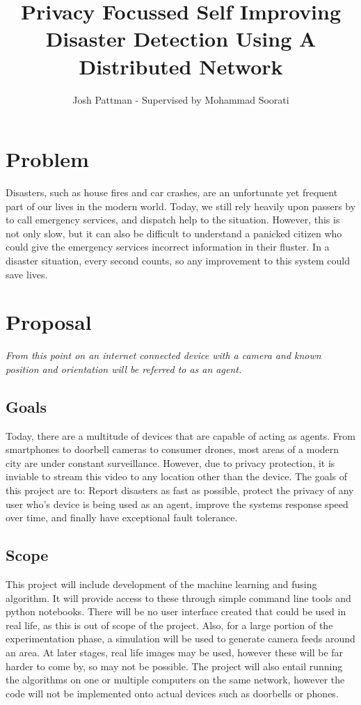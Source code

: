 \documentclass{article}
\title{Privacy Focussed Self Improving Disaster Detection Using A Distributed Network}
\author{Josh Pattman - Supervised by Mohammad Soorati}
\begin{document}
\maketitle

\section{Problem}
Disasters, such as house fires and car crashes, are an unfortunate yet frequent part of our lives in the modern world. Today, we still rely heavily upon passers by to call emergency services, and dispatch help to the situation. However, this is not only slow, but it can also be difficult to understand a panicked citizen who could give the emergency services incorrect information in their fluster. In a disaster situation, every second counts, so any improvement to this system could save lives.

\section{Proposal}
\emph{From this point on an internet connected device with a camera and known position and orientation will be referred to as an agent.}
\subsection{Goals}
Today, there are a multitude of devices that are capable of acting as agents. From smartphones to doorbell cameras to consumer drones, most areas of a modern city are under constant surveillance. However, due to privacy protection, it is inviable to stream this video to any location other than the device. The goals of this project are to: Report disasters as fast as possible, protect the privacy of any user who's device is being used as an agent, improve the systems response speed over time, and finally have exceptional fault tolerance.


\subsection{Scope}
This project will include development of the machine learning and fusing algorithm. It will provide access to these through simple command line tools and python notebooks. There will be no user interface created that could be used in real life, as this is out of scope of the project. Also, for a large portion of the experimentation phase, a simulation will be used to generate camera feeds around an area. At later stages, real life images may be used, however these will be far harder to come by, so may not be possible. The project will also entail running the algorithms on one or multiple computers on the same network, however the code will not be implemented onto actual devices such as doorbells or phones.
\end{document}
